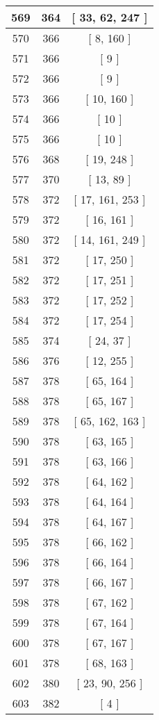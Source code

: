 \begin{center}
\begin{longtable}[H]{|| c c c ||}
569 & 364 & [ 33, 62, 247 ] \\ 
\hline
570 & 366 & [ 8, 160 ] \\ 
\hline
571 & 366 & [ 9 ] \\ 
\hline
572 & 366 & [ 9 ] \\ 
\hline
573 & 366 & [ 10, 160 ] \\ 
\hline
574 & 366 & [ 10 ] \\ 
\hline
575 & 366 & [ 10 ] \\ 
\hline
576 & 368 & [ 19, 248 ] \\ 
\hline
577 & 370 & [ 13, 89 ] \\ 
\hline
578 & 372 & [ 17, 161, 253 ] \\ 
\hline
579 & 372 & [ 16, 161 ] \\ 
\hline
580 & 372 & [ 14, 161, 249 ] \\ 
\hline
581 & 372 & [ 17, 250 ] \\ 
\hline
582 & 372 & [ 17, 251 ] \\ 
\hline
583 & 372 & [ 17, 252 ] \\ 
\hline
584 & 372 & [ 17, 254 ] \\ 
\hline
585 & 374 & [ 24, 37 ] \\ 
\hline
586 & 376 & [ 12, 255 ] \\ 
\hline
587 & 378 & [ 65, 164 ] \\ 
\hline
588 & 378 & [ 65, 167 ] \\ 
\hline
589 & 378 & [ 65, 162, 163 ] \\ 
\hline
590 & 378 & [ 63, 165 ] \\ 
\hline
591 & 378 & [ 63, 166 ] \\ 
\hline
592 & 378 & [ 64, 162 ] \\ 
\hline
593 & 378 & [ 64, 164 ] \\ 
\hline
594 & 378 & [ 64, 167 ] \\ 
\hline
595 & 378 & [ 66, 162 ] \\ 
\hline
596 & 378 & [ 66, 164 ] \\ 
\hline
597 & 378 & [ 66, 167 ] \\ 
\hline
598 & 378 & [ 67, 162 ] \\ 
\hline
599 & 378 & [ 67, 164 ] \\ 
\hline
600 & 378 & [ 67, 167 ] \\ 
\hline
601 & 378 & [ 68, 163 ] \\ 
\hline
602 & 380 & [ 23, 90, 256 ] \\ 
\hline
603 & 382 & [ 4 ] \\ 

\end{longtable}
\end{center}
